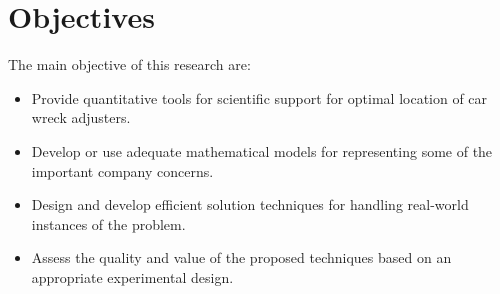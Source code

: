 \section{Objectives}
The main objective
of this research are:
\begin{itemize}
\item Provide quantitative tools
  for scientific support
  for optimal location
  of car wreck adjusters.
\item Develop or use
  adequate mathematical models
  for representing
  some of the important company concerns.
\item Design and develop efficient solution techniques
  for handling real-world instances of the problem.
\item Assess 
  the quality and value of the proposed techniques
  based on an appropriate experimental design.
\end{itemize}
